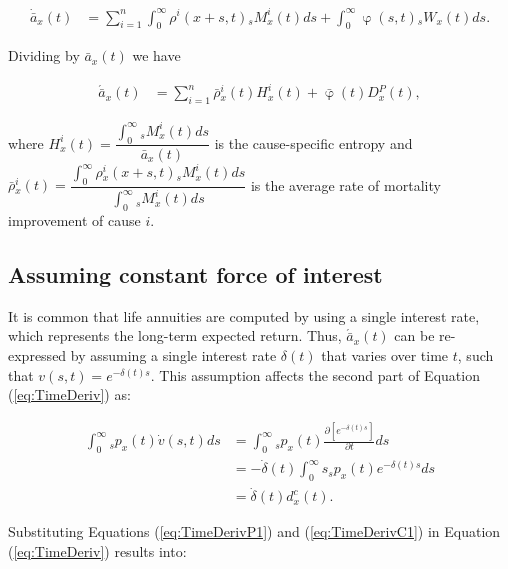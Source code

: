 \documentclass[12pt]{article}
\begin{document}
\begin{equation}\label{eq:TimeDerivCoD2}
\begin{split}
\dot{\bar{a}} _x(t) &= \sum_{i=1}^{n} \int_0^\infty  \rho^{i}(x+s,t){}_sM^{i}_x(t)ds +\int_0^\infty  \upvarphi(s,t) {}_sW_x(t) ds.
\end{split}
\end{equation}

Dividing by $\bar{a} _x(t)$ we have


\begin{equation}\label{eq:TimeDerivCoD3}
\begin{split}
\acute{\bar{a}} _x(t) &= \sum_{i=1}^{n} \bar{\rho}{^i_x}(t){H}^{i}_x(t)+\bar{\upvarphi}(t){D}{^P_x}(t),
\end{split}
\end{equation}


where ${H}^{i}_x(t)=\dfrac{\int_{0}^{\infty}{}_sM^{i}_x(t)ds}{\bar{a} _x(t)}$ is the cause-specific entropy and $\bar{\rho}{^i_x}(t)=\dfrac{\int_{0}^{\infty}\rho{_x^i}(x+s,t) {}_sM^{i}_x(t)ds}{\int_{0}^{\infty}{}_sM^{i}_x(t)ds}$ is the average rate of mortality improvement of cause $i$.

\subsection{Assuming constant force of interest}


It is common that life annuities are computed by using a single interest rate, which represents the long-term expected return. Thus, $\acute{\bar{a}}_x(t)$ can be re-expressed by assuming a single interest rate $\delta(t)$ that varies over time $t$, such that $v(s,t)=e^{-\delta(t)s}$. This assumption affects the second part of Equation (\ref{eq:TimeDeriv}) as: 




\begin{equation}\label{eq:TimeDerivC1}
\begin{split}
\int_0^\infty {}_s{p}_x(t) \dot{v}(s,t)ds &=\int_0^\infty {}_s{p}_x(t) \frac{\partial \left[ e^{-\delta(t)s} \right]}{\partial t}ds \\
&=-\dot{\delta}(t)\int_0^\infty s  {}_s{p}_x(t) e^{-\delta(t)s} ds \\
&=  \dot{\delta}(t)  d^{c}_x(t).
\end{split}
\end{equation}

Substituting Equations (\ref{eq:TimeDerivP1}) and (\ref{eq:TimeDerivC1}) in Equation (\ref{eq:TimeDeriv}) results into: 
\end{document}
